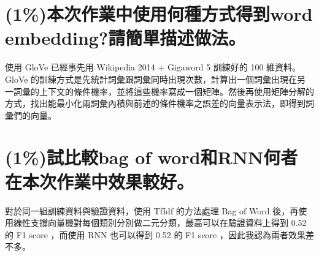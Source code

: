 \documentclass[fleqn,a4paper,12pt]{article}
\begin{document}
\section{(1\%)本次作業中使用何種方式得到word embedding?請簡單描述做法。}

使用 GloVe 已經事先用 Wikipedia 2014 + Gigaword 5 訓練好的 100 維資料。 GloVe 的訓練方式是先統計詞彙跟詞彙同時出現次數，計算出一個詞彙出現在另一詞彙的上下文的條件機率，並將這些機率寫成一個矩陣。然後再使用矩陣分解的方式，找出能最小化兩詞彙內積與前述的條件機率之誤差的向量表示法，即得到詞彙們的向量。

\section{(1\%)試比較bag of word和RNN何者在本次作業中效果較好。}

對於同一組訓練資料與驗證資料，使用 TfIdf 的方法處理 Bag of Word 後，再使用線性支撐向量機對每個類別分別做二元分類，最高可以在驗證資料上得到 0.52 的 F1 score ，而使用 RNN 也可以得到 0.52 的 F1 score ，因此我認為兩者效果差不多。
\end{document}
